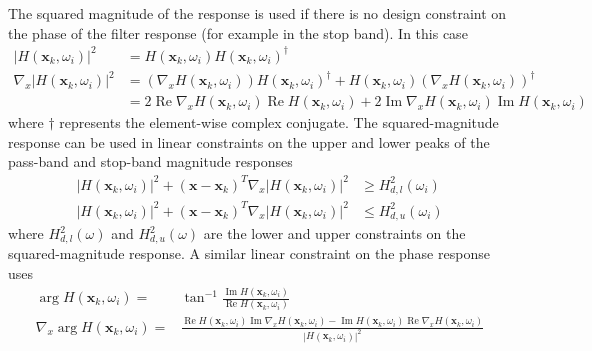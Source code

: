 \documentclass[a4paper,twoside,10pt,english]{report}
\begin{document}
The squared magnitude of the response is used if there is no design constraint
on the phase of the filter response (for example in the stop band). In this case
\begin{align*}
\left|H\left(\boldsymbol{x}_{k},\omega_{i}\right)\right|^{2}&=
H\left(\boldsymbol{x}_{k},\omega_{i}\right)
H\left(\boldsymbol{x}_{k},\omega_{i}\right)^{\dagger}\\
\nabla_{x}\left|H\left(\boldsymbol{x}_{k},\omega_{i}\right)\right|^{2}&=
\left(\nabla_{x}H\left(\boldsymbol{x}_{k},\omega_{i}\right)\right)
H\left(\boldsymbol{x}_{k},\omega_{i}\right)^{\dagger} +
H\left(\boldsymbol{x}_{k},\omega_{i}\right)
\left(\nabla_{x}H\left(\boldsymbol{x}_{k},\omega_{i}\right)\right)^{\dagger}\\
&=2\operatorname{Re}\nabla_{x}H\left(\boldsymbol{x}_{k},\omega_{i}\right)
\operatorname{Re}H\left(\boldsymbol{x}_{k},\omega_{i}\right)+
2\operatorname{Im}\nabla_{x}H\left(\boldsymbol{x}_{k},\omega_{i}\right)
\operatorname{Im}H\left(\boldsymbol{x}_{k},\omega_{i}\right)
\end{align*}
where $\dagger$ represents the element-wise complex conjugate.
The squared-magnitude response can be used in linear constraints on the 
upper and lower peaks of the pass-band and stop-band magnitude responses
\begin{align*}
\left|H\left(\boldsymbol{x}_{k},\omega_{i}\right)\right|^{2} +
\left(\boldsymbol{x}-\boldsymbol{x}_{k}\right)^{T}
\nabla_{x}\left|H\left(\boldsymbol{x}_{k},\omega_{i}\right)\right|^{2}
&\ge H_{d,l}^{2}\left(\omega_{i}\right) \\
\left|H\left(\boldsymbol{x}_{k},\omega_{i}\right)\right|^{2} +
\left(\boldsymbol{x}-\boldsymbol{x}_{k}\right)^{T}
\nabla_{x}\left|H\left(\boldsymbol{x}_{k},\omega_{i}\right)\right|^{2}
&\le H_{d,u}^{2}\left(\omega_{i}\right)
\end{align*}
where $H_{d,l}^{2}\left(\omega\right)$ and $H_{d,u}^{2}\left(\omega\right)$ 
are the lower and upper constraints on the squared-magnitude 
response. A similar linear constraint on the phase response uses
\begin{align*}
\arg H\left(\boldsymbol{x}_{k},\omega_{i}\right)=
&\tan^{-1}\frac{\operatorname{Im}H\left(\boldsymbol{x}_{k},\omega_{i}\right)}
{\operatorname{Re}H\left(\boldsymbol{x}_{k},\omega_{i}\right)}\\
\nabla_{x}\arg H\left(\boldsymbol{x}_{k},\omega_{i}\right)=
&\frac{\operatorname{Re}H\left(\boldsymbol{x}_{k},\omega_{i}\right)
\operatorname{Im}\nabla_{x} H\left(\boldsymbol{x}_{k},\omega_{i}\right) -
\operatorname{Im}H\left(\boldsymbol{x}_{k},\omega_{i}\right)
\operatorname{Re}\nabla_{x} H\left(\boldsymbol{x}_{k},\omega_{i}\right)}
{\left|H\left(\boldsymbol{x}_{k},\omega_{i}\right)\right|^{2}}
\end{align*}
\end{document}
